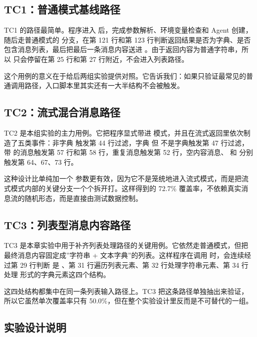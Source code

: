 \subsection{TC1：普通模式基线路径}

TC1 的路径最简单。程序进入  后，完成参数解析、环境变量检查和 Agent 创建，随后走普通模式的  分支，在第 121 行和第 123 行判断返回结果是否为字典、是否包含消息列表，最后把最后一条消息内容送进 。由于返回内容为普通字符串，所以  只会停留在第 25 行和第 27 行附近，不会进入列表路径。

这个用例的意义在于给后两组实验提供对照。它告诉我们：如果只验证最常见的普通调用路径，入口脚本里其实还有一大半结构不会被触发。

\subsection{TC2：流式混合消息路径}

TC2 是本组实验的主力用例。它把程序显式带进  模式，并且在流式返回里依次制造了五类事件：非字典  触发第 44 行过滤，字典  但  不是字典触发第 47 行过滤，带  的消息触发第 57 行和第 58 行，重复消息触发第 52 行，空内容消息、 和  分别触发第 64、67、73 行。

这种设计比单纯加一个  参数更有效，因为它不是笼统地进入流式模式，而是把流式模式内部的关键分支一个个拆开打。这样得到的 72.7\% 覆盖率，不依赖真实消息流的随机形态，而是直接由测试数据控制。

\subsection{TC3：列表型消息内容路径}

TC3 是本章实验中用于补齐列表处理路径的关键用例。它依然走普通模式，但把最终消息内容固定成”字符串 + 文本字典”的列表。这样程序在调用  时，会连续经过第 29 行判断  是 、第 31 行遍历列表元素、第 32 行处理字符串元素、第 34 行处理  形式的字典元素这四个结构。

这四处结构都集中在同一条列表输入路径上。TC3 把这条路径单独抽出来验证，所以它虽然单次覆盖率只有 50.0\%，但在整个实验设计里反而是不可替代的一组。

\subsection{实验设计说明}

